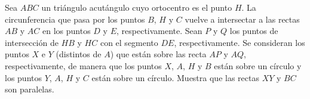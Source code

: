 Sea $ABC$ un triángulo acutángulo cuyo ortocentro es el punto $H$. La circunferencia que
pasa por los puntos $B$, $H$ y $C$ vuelve a intersectar a las rectas $AB$ y $AC$ en los puntos $D$ y
$E$, respectivamente. Sean $P$ y $Q$ los puntos de intersección de $HB$ y $HC$ con el segmento
$DE$, respectivamente. Se consideran los puntos $X$ e $Y$ (distintos de $A$) que están sobre
las recta $AP$ y $AQ$, respectivamente, de manera que los puntos $X$, $A$, $H$ y $B$ están sobre
un círculo y los puntos $Y$, $A$, $H$ y $C$ están sobre un círculo. Muestra que las rectas $XY$
y $BC$ son paralelas.